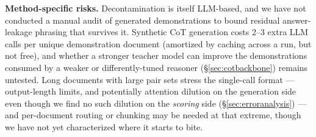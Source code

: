 \documentclass[11pt]{article}
\begin{document}
\textbf{Method-specific risks.} Decontamination is itself LLM-based, and we have
not conducted a manual audit of generated demonstrations to bound residual
answer-leakage phrasing that survives it. Synthetic CoT generation costs 2--3
extra LLM calls per unique demonstration document (amortized by caching across a
run, but not free), and whether a stronger teacher model can improve the
demonstrations consumed by a weaker or differently-tuned reasoner
(\S\ref{sec:cotbackbone}) remains untested. Long documents with large pair sets
stress the single-call format --- output-length limits, and potentially attention
dilution on the generation side even though we find no such dilution on the
\emph{scoring} side (\S\ref{sec:erroranalysis}) --- and per-document routing or
chunking may be needed at that extreme, though we have not yet characterized where
it starts to bite.



\end{document}
